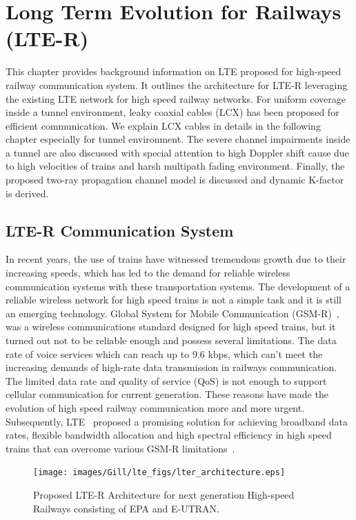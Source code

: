 \chapter{Long Term Evolution for Railways (LTE-R)}
\label{chapter4}

This chapter provides background information on LTE proposed for high-speed railway communication system. It outlines the architecture for LTE-R leveraging the existing LTE network for high speed railway networks. For uniform coverage inside a tunnel environment, leaky coaxial cables (LCX) has been proposed for efficient communication. We explain LCX cables in details in the following chapter especially for tunnel environment. The severe channel impairments inside a tunnel are also discussed with special attention to high Doppler shift cause due to high velocities of trains and harsh multipath fading environment. Finally, the proposed two-ray propagation channel model is discussed and dynamic K-factor is derived.

\section{LTE-R Communication System}

In recent years, the use of trains have witnessed tremendous growth due to their increasing speeds, which has led to the demand for reliable wireless communication systems with these transportation systems. The development of a reliable wireless network for high speed trains is not a simple task and it is still an emerging technology. Global System for Mobile
Communication (GSM-R)~\cite{trlter1}, was a wireless communications standard designed for high speed trains, but it turned out not to be reliable enough and possess several limitations. The data rate of voice services which can reach up to 9.6 kbps, which can't meet the increasing demands of high-rate data transmission in railways communication. The limited data rate and quality of service (QoS) is not enough to support cellular communication for current generation. These reasons have made the evolution of high speed railway communication more and more urgent.  Subsequently, LTE~\cite{trlter2} proposed a promising solution for achieving broadband data rates, flexible bandwidth allocation and high spectral efficiency in high speed trains that can overcome various GSM-R limitations~\cite{arlter3,inplter4}.

\begin{figure}[!ht]
\centering
\texttt{[image: images/Gill/lte\_figs/lter\_architecture.eps]} 
\caption{Proposed LTE-R Architecture for next generation High-speed Railways consisting of EPA and E-UTRAN.}
\label{ltearch}
\end{figure}

